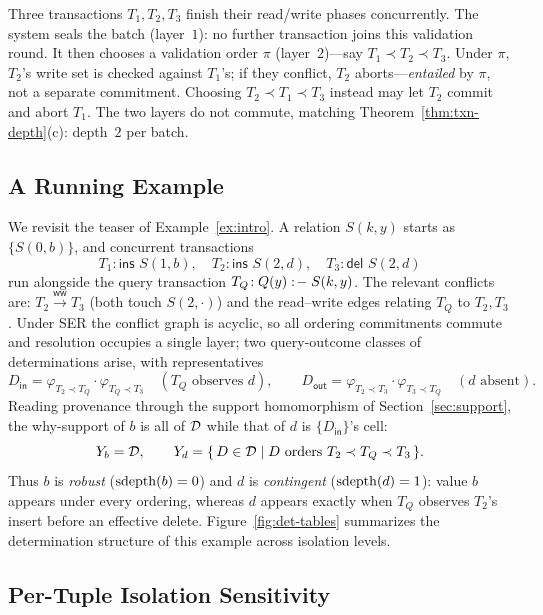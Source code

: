 \begin{example}
  \label{ex:txn-batch}
  Three transactions $T_1,T_2,T_3$ finish their read/write phases concurrently.
  The system seals the batch (layer~$1$): no further transaction joins this
  validation round. It then chooses a validation order $\pi$ (layer~$2$)---say
  $T_1 \prec T_2 \prec T_3$. Under $\pi$, $T_2$'s write set is checked against
  $T_1$'s; if they conflict, $T_2$ aborts---\emph{entailed} by $\pi$, not a
  separate commitment. Choosing $T_2 \prec T_1 \prec T_3$ instead may let $T_2$
  commit and abort $T_1$. The two layers do not commute, matching
  Theorem~\ref{thm:txn-depth}(c): depth~$2$ per batch.
\end{example}

\subsection{A Running Example}
\label{ex:txn-running}

We revisit the teaser of Example~\ref{ex:intro}. A relation $S(k,y)$ starts as
$\{S(0,b)\}$, and concurrent transactions
\[
  T_1\!:\textsf{ins } S(1,b),\quad
  T_2\!:\textsf{ins } S(2,d),\quad
  T_3\!:\textsf{del } S(2,d)
\]
run alongside the query transaction $T_Q\!: Q(y) \mathrel{:\!-} S(k,y)$. The relevant
conflicts are: $T_2 \xrightarrow{\mathsf{ww}} T_3$ (both touch $S(2,\cdot)$) and
the read--write edges relating $T_Q$ to $T_2,T_3$. Under SER the conflict graph
is acyclic, so all ordering commitments commute and resolution occupies a single
layer; two query-outcome classes of determinations arise, with representatives
\[
  D_{\mathsf{in}} = \varphi_{T_2 \prec T_Q} \cdot \varphi_{T_Q \prec T_3}
  \quad(\text{$T_Q$ observes $d$}),
  \qquad
  D_{\mathsf{out}} = \varphi_{T_2 \prec T_3} \cdot \varphi_{T_3 \prec T_Q}
  \quad(\text{$d$ absent}).
\]
Reading provenance through the support homomorphism of
Section~\ref{sec:support}, the why-support of $b$ is all of $\mathcal{D}$ while that
of $d$ is $\{D_{\mathsf{in}}\}$'s cell:
\[
  Y_b = \mathcal{D}, \qquad Y_d = \{\,D \in \mathcal{D} \mid D \text{ orders } T_2 \prec T_Q \prec T_3\,\}.
\]
Thus $b$ is \emph{robust} ($\operatorname{sdepth}(b) = 0$) and $d$ is \emph{contingent}
($\operatorname{sdepth}(d) = 1$): value $b$ appears under every ordering, whereas $d$ appears
exactly when $T_Q$ observes $T_2$'s insert before an effective delete.
Figure~\ref{fig:det-tables} summarizes the determination structure of this
example across isolation levels.

\subsection{Per-Tuple Isolation Sensitivity}
\label{sec:txn-sensitivity}

